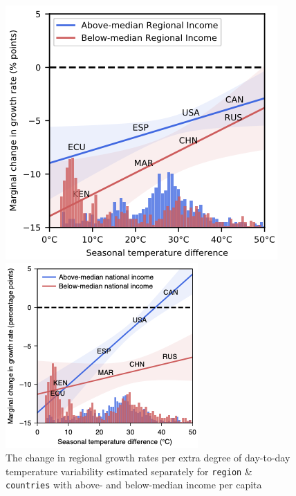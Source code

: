 \documentclass[12pt,twoside]{report}
\begin{document}
	\begin{figure}[htb]
		\begin{minipage}[t]{0.51\linewidth}
			\centering
			\includegraphics[width=1\linewidth]{./figures/D2D-national}
		\end{minipage}%
		\begin{minipage}[t]{0.49\linewidth}
			\centering
			\includegraphics[width=1\linewidth]{./figures/D2D-regional}
		\end{minipage}
		\caption{The change in regional growth rates per extra degree of day-to-day temperature variability estimated
		separately for \texttt{region} \& \texttt{countries} with above- and below-median income per
		capita\cite{Day2Day}}
		\label{fig:NeoLayer}
	\end{figure}
\end{document}
